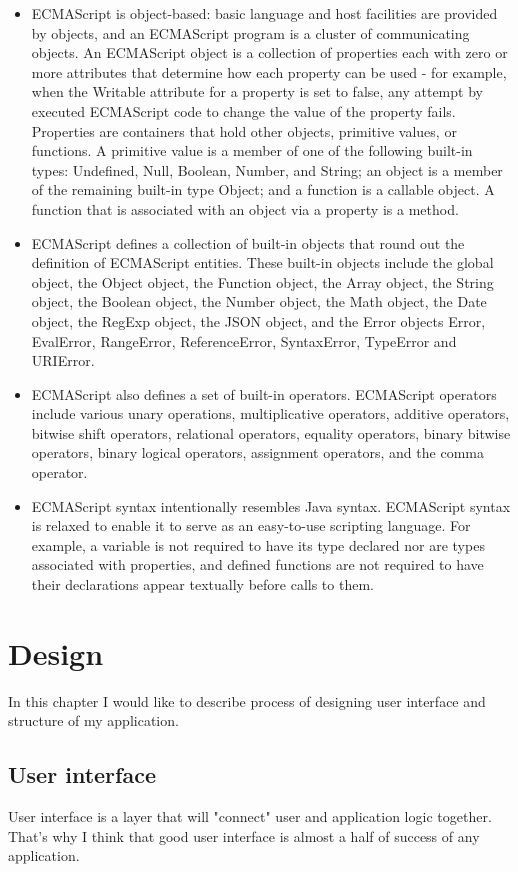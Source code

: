 \documentclass[thesis=B,english]{FITthesis}[2012/10/20]
\begin{document}
	\begin{itemize}
\item ECMAScript is object-based: basic language and host facilities are provided by objects, and an ECMAScript program is a cluster of communicating objects. An ECMAScript object is a collection of properties each with zero or more attributes that determine how each property can be used - for example, when the Writable attribute for a property is set to false, any attempt by executed ECMAScript code to change the value of the property fails. Properties are containers that hold other objects, primitive values, or functions. A primitive value is a member of one of the following built-in types: Undefined, Null, Boolean, Number, and String; an object is a member of the remaining built-in type Object; and a function is a callable object. A function that is associated with an object via a property is a method.
\item ECMAScript defines a collection of built-in objects that round out the definition of ECMAScript entities. These built-in objects include the global object, the Object object, the Function object, the Array object, the String object, the Boolean object, the Number object, the Math object, the Date object, the RegExp object, the JSON object, and the Error objects Error, EvalError, RangeError, ReferenceError, SyntaxError, TypeError and URIError.
\item ECMAScript also defines a set of built-in operators. ECMAScript operators include various unary operations, multiplicative operators, additive operators, bitwise shift operators, relational operators, equality operators, binary bitwise operators, binary logical operators, assignment operators, and the comma operator.
\item ECMAScript syntax intentionally resembles Java syntax. ECMAScript syntax is relaxed to enable it to serve as an easy-to-use scripting language. For example, a variable is not required to have its type declared nor are types associated with properties, and defined functions are not required to have their declarations appear textually before calls to them.\cite{ecma}
	\end{itemize}

\chapter{Design}
In this chapter I would like to describe process of designing user interface and structure of my application.
\section{User interface}
User interface is a layer that will "connect" user and application logic together. That's why I think that good user interface is almost a half of success of any application. 
\end{document}
